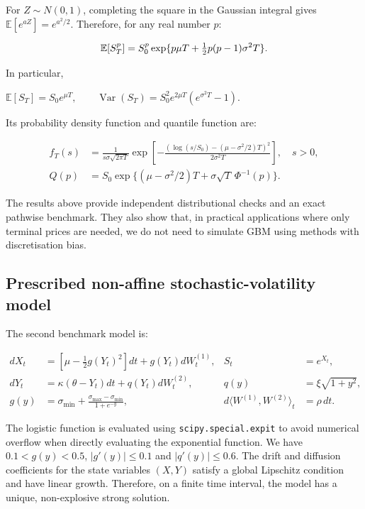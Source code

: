 For $Z\sim N(0,1)$, completing the square in the Gaussian integral gives $\mathbb{E}[e^{aZ}]=e^{a^2/2}$. Therefore, for any real number $p$:

\begin{equation}\label{eq:gbmmoments}
\mathbb E[S_T^p]=S_0^p\exp\{p\mu T+\tfrac12p(p-1)\sigma^2T\}.
\end{equation}

In particular,

$\mathbb{E}[S_T]=S_0e^{\mu T}, \qquad \operatorname{Var}(S_T)=S_0^2e^{2\mu T}(e^{\sigma^2T}-1).$

Its probability density function and quantile function are:

\begin{align}
f_T(s)&=\frac{1}{s\sigma\sqrt{2\pi T}}\exp\!\left[-\frac{(\log(s/S_0)-(\mu-\sigma^2/2)T)^2}{2\sigma^2T}\right],\quad s>0,\\
Q(p)&=S_0\exp\{(\mu-\sigma^2/2)T+\sigma\sqrt T\,\Phi^{-1}(p)\}.
\end{align}

The results above provide independent distributional checks and an exact pathwise benchmark. They also show that, in practical applications where only terminal prices are needed, we do not need to simulate GBM using methods with discretisation bias.

\subsection{Prescribed non-affine stochastic-volatility model}

The second benchmark model is:

\begin{align}\label{eq:sv}
dX_t&=[\mu-\tfrac12g(Y_t)^2]dt+g(Y_t)dW_t^{(1)}, & S_t&=e^{X_t},\\
dY_t&=\kappa(\theta-Y_t)dt+q(Y_t)dW_t^{(2)}, & q(y)&=\xi\sqrt{1+y^2},\\
g(y)&=\sigma_{\min}+\frac{\sigma_{\max}-\sigma_{\min}}{1+e^{-y}}, &d\langle W^{(1)},W^{(2)}\rangle_t&=\rho\,dt.
\end{align}

The logistic function is evaluated using \texttt{scipy.special.expit} to avoid numerical overflow when directly evaluating the exponential function. We have $0.1<g(y)<0.5$, $|g'(y)|\leq0.1$ and $|q'(y)|\leq0.6$. The drift and diffusion coefficients for the state variables $(X,Y)$ satisfy a global Lipschitz condition and have linear growth. Therefore, on a finite time interval, the model has a unique, non-explosive strong solution.

